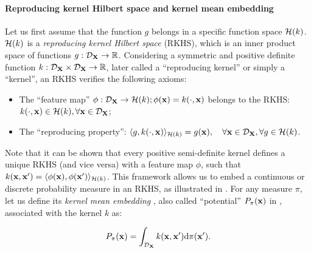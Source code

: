 \paragraph{Reproducing kernel Hilbert space and kernel mean embedding}
Let us first assume that the function $g$ belongs in a specific function space $\mathcal{H}(k)$. 
$\mathcal{H}(k)$ is a \emph{reproducing kernel Hilbert space} (RKHS), which is an inner product space of functions $g:\mathcal{D}_{{\bf X}} \rightarrow \mathbb{R}$. 
Considering a symmetric and positive definite function $k: \mathcal{D}_{{\bf X}} \times \mathcal{D}_{{\bf X}} \rightarrow \mathbb{R}$, later called a ``reproducing kernel'' or simply a ``kernel'', an RKHS verifies the following axioms: 
\begin{itemize}
    \item The ``feature map'' $\phi : \mathcal{D}_{{\bf X}} \to \mathcal{H}(k); \phi({\bf x}) = k(\cdot, {\bf x})$ belongs to the RKHS: $k(\cdot, {\bf x}) \in \mathcal{H}(k), \forall {\bf x} \in \mathcal{D}_{{\bf X}}$;
    \item The ``reproducing property'': $\langle g, k(\cdot, {\bf x}) \rangle_{\mathcal{H}(k)} = g({\bf x}), \quad \forall {\bf x} \in \mathcal{D}_{{\bf X}}, \forall g \in \mathcal{H}(k)$.
\end{itemize}
Note that it can be shown that every positive semi-definite kernel defines a unique RKHS (and vice versa) with a feature map $\phi$, such that $k({\bf x}, {\bf x}') = \langle \phi({\bf x}), \phi({\bf x}') \rangle_{\mathcal{H}(k)}$.
This framework allows us to embed a continuous or discrete probability measure in an RKHS, as illustrated in . 
For any measure $\pi$, let us define its \emph{kernel mean embedding} \citep{sejdinovic_2013}, also called ``potential'' $P_{\pi}({\bf x})$ in \cite{pronzato_zhigljavsky_2020}, associated with the kernel $k$ as:

\begin{equation}
   P_{\pi}({\bf x}) = \int_{\mathcal{D}_{{\bf X}}} k({\bf x}, {\bf x}') \mathrm{d} \pi({\bf x}').
\end{equation}

